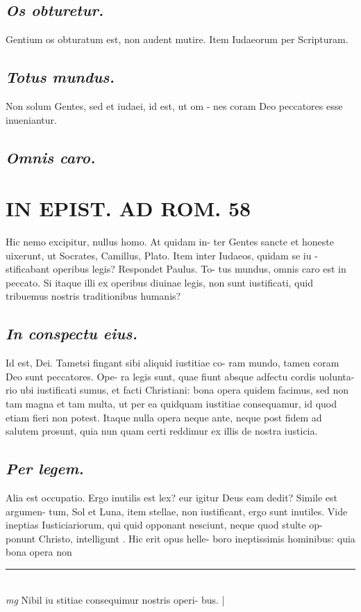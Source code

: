 \documentclass{article}
\begin{document}
\begin{pages}
\subsection*{\textit{Os obturetur. }}\pstart Gentium os obturatum est, non audent mutire.  Item Iudaeorum per Scripturam.  \pend
{}
{}
\subsection*{\textit{Totus mundus. }}\pstart Non solum Gentes, sed et iudaei, id est, ut om - nes coram Deo peccatores esse inueniantur.   \pend
{}
{}
\subsection*{\textit{Omnis caro. }}
\section*{IN EPIST. AD ROM.  58 }
\marginpar{[ p.]}\pstart Hic nemo excipitur, nullus homo. At quidam in- ter Gentes sancte et honeste uixerunt, ut Socrates, Camillus, Plato. Item inter Iudaeos, quidam se iu - stificabant operibus legis? Respondet Paulus. To- tus mundus, omnis caro est in peccato. Si itaque illi ex operibus diuinae legis, non sunt iustificati, quid tribuemus nostris traditionibus humanis?  \pend
{}
{}
\subsection*{\textit{In conspectu eius. }}\pstart Id est, Dei. Tametsi fingant sibi aliquid iustitiae co- ram mundo, tamen coram Deo sunt peccatores. Ope- ra legis sunt, quae fiunt absque adfectu cordis uolunta- rio ubi iustificati sumus, et facti Christiani: bona opera quidem facimus, sed non tam magna et tam multa, ut per ea quidquam iustitiae consequamur, id quod etiam fieri non potest. Itaque nulla opera neque  ante, neque post fidem ad salutem prosunt, quia nun quam certi reddimur ex illis de nostra iusticia.   \pend
{}
{}
\subsection*{\textit{Per legem. }}\pstart Alia est occupatio. Ergo inutilis est lex? eur igitur Deus eam dedit? Simile est argumen- tum, Sol et Luna, item stellae, non iustificant, ergo sunt inutiles. Vide ineptias Iusticiariorum, qui quid opponant nesciunt, neque quod stulte op- ponunt Christo, intelligunt . Hic erit opus helle- boro ineptissimis hominibus: quia bona opera non  \pend
\vspace{0.5cm}\noindent
\vspace{0.2cm}\rule{1cm}{0.2pt}\\ 
\hspace{0.2cm}\textit{mg}
\footnotesize Nibil iu stitiae consequimur nostris operi- bus.  
\normalsize| 

\end{pages}
\end{document}
